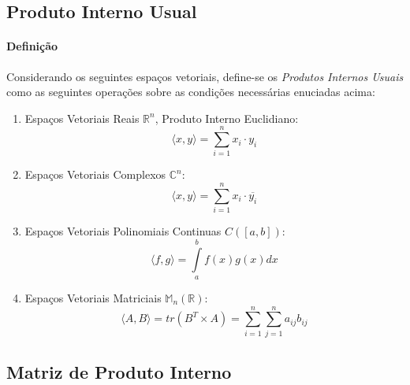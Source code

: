 \documentclass{article}
\begin{document}
        \subsection{Produto Interno Usual}
            \paragraph{Definição}Considerando os seguintes espaços vetoriais, define-se os \textit{Produtos Internos Usuais} como as seguintes operações sobre as condições necessárias enuciadas acima:
                \begin{enumerate}[noitemsep]
                    \item Espaços Vetoriais Reais $\mathbb{R}^{n}$, Produto Interno Euclidiano:
                        \[\boxed{\langle x, y \rangle = \sum\limits_{i = 1}^{n} x_{i}\cdot y_{i}}\]
                    \item Espaços Vetoriais Complexos $\mathbb{C}^{n}$:
                        \[\boxed{\langle x, y \rangle = \sum\limits_{i = 1}^{n} x_{i}\cdot \overline{y_{i}}}\]
                    \item Espaços Vetoriais Polinomiais Continuas $C([a,b])$:
                        \[\boxed{\langle f, g \rangle = \int\limits_{a}^{b} f(x) g(x) dx}\]
                    \item Espaços Vetoriais Matriciais $\mathbb{M}_{n}(\mathbb{R})$:
                        \[\boxed{\langle A, B \rangle = tr(B^{T} \times A) = \sum\limits_{i = 1}^{n} \sum\limits_{j = 1}^{n} a_{ij}b_{ij}}\]  
                \end{enumerate}

        \subsection{Matriz de Produto Interno}
\end{document}
